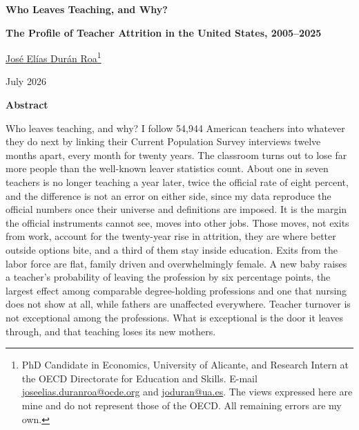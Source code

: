 \documentclass[11pt,a4paper]{article}
\begin{document}
\vspace*{30pt}
\begin{center}
{\fontsize{20}{26}\selectfont\bfseries
Who Leaves Teaching, and Why?\par}
\vspace{8pt}
{\fontsize{15}{20}\selectfont\bfseries
The Profile of Teacher Attrition in the United States, 2005--2025\par}

\vspace{26pt}
{\large \href{https://sites.google.com/view/joseeliasduranroa}{José Elías Durán Roa}\footnote{PhD Candidate in Economics,
University of Alicante, and Research Intern at the OECD Directorate for
Education and Skills. E-mail\,
\href{mailto:joseelias.duranroa@ocde.org}{joseelias.duranroa@ocde.org} and
\href{mailto:joduran@ua.es}{joduran@ua.es}. The views expressed here are
mine and do not represent those of the OECD. All remaining errors are my
own.}}

\vspace{8pt}
{\small July 2026}
\end{center}

\vspace{26pt}
\begin{center}
\begin{minipage}{0.86\textwidth}
{\fontsize{10.5}{14.5}\selectfont
\begin{center}\bfseries Abstract\end{center}\vspace{2pt}
Who leaves teaching, and why? I follow 54{,}944 American teachers into
whatever they do next by linking their Current Population Survey
interviews twelve months apart, every month for twenty years. The
classroom turns out to lose far more people than the well-known leaver
statistics count. About one in seven teachers is no longer teaching a
year later, twice the official rate of eight percent, and the difference
is not an error on either side, since my data reproduce the official
numbers once their universe and definitions are imposed. It is the margin
the official instruments cannot see, moves into other jobs. Those moves,
not exits from work, account for the twenty-year rise in attrition, they
are where better outside options bite, and a third of them stay inside
education. Exits from the labor force are flat, family driven and
overwhelmingly female. A new baby raises a teacher's probability of
leaving the profession by six percentage points, the largest effect
among comparable degree-holding professions and one that nursing does
not show at all, while fathers are unaffected everywhere. Teacher
turnover is not exceptional among the professions. What is exceptional
is the door it leaves through, and that teaching loses its new mothers.}
\end{minipage}
\end{center}
\end{document}
